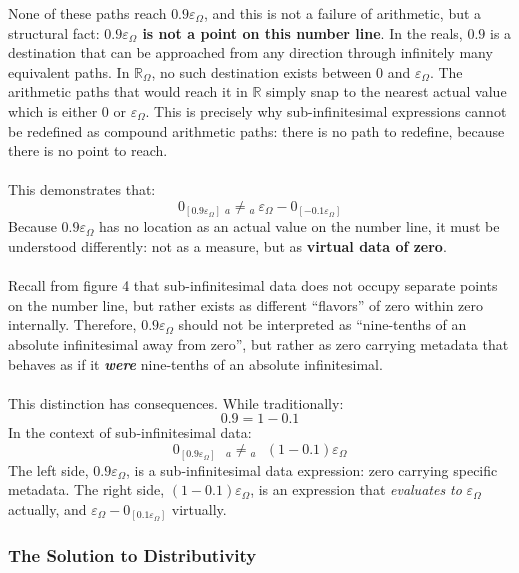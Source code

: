 \documentclass{article}
\begin{document}
None of these paths reach $0.9\varepsilon_\Omega$, and this is not a failure of 
arithmetic, but a structural fact: \textbf{$0.9\varepsilon_\Omega$ is not a point on 
this number line}. In the reals, $0.9$ is a destination that can be approached from 
any direction through infinitely many equivalent paths. In $\mathbb{R}_\Omega$, no such 
destination exists between $0$ and $\varepsilon_\Omega$. The arithmetic paths that 
would reach it in $\mathbb{R}$ simply snap to the nearest actual value which is 
either $0$ or $\varepsilon_\Omega$. This is precisely why sub-infinitesimal expressions 
cannot be redefined as compound arithmetic paths: there is no path to redefine, because 
there is no point to reach.
\\\\This demonstrates that:
$$0_{[0.9\varepsilon_\Omega]} \ {}_a{\neq}{}_a 
\ \varepsilon_\Omega - 0_{[-0.1\varepsilon_\Omega]}$$ Because $0.9\varepsilon_\Omega$ has no location as an actual value on the number line, it must be understood differently: not as a measure, but as \textbf{virtual data of zero}. \\\\Recall from figure 4 that sub-infinitesimal data does not occupy separate points on the number line, but rather exists as different ``flavors'' of zero within zero internally. Therefore, $0.9\varepsilon_\Omega$ should not be interpreted as ``nine-tenths of an absolute infinitesimal away from zero'', but rather as zero carrying metadata that behaves as if it \textit{\textbf{were}} nine-tenths of an absolute infinitesimal.
\\\\This distinction has consequences. While traditionally:
$$0.9 = 1 - 0.1$$In the context of sub-infinitesimal data:
$$0_{[0.9\varepsilon_\Omega]} \text{ }_a{\neq}{}_a \text{ }(1 - 0.1)\varepsilon_\Omega$$The left side, $0.9\varepsilon_\Omega$, is a sub-infinitesimal data expression: zero carrying specific metadata. The right side, $(1 - 0.1)\varepsilon_\Omega$, is an expression that \textit{evaluates to} $\varepsilon_\Omega$ actually, and $\varepsilon_\Omega-0_{[0.1\varepsilon_\Omega]}$ virtually.

\subsubsection{The Solution to Distributivity}
\end{document}
